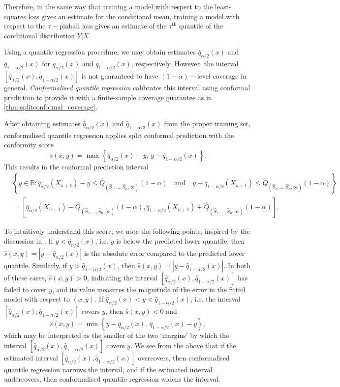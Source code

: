 \documentclass[11pt, titlepage]{article} %
\newcommand{\R}{\mathrm}
\numberwithin{equation}{section}
\theoremstyle{definition}
\numberwithin{theorem}{section}
\numberwithin{lemma}{section}
\numberwithin{corollary}{section}
\numberwithin{proposition}{section}
\numberwithin{definition}{section}
\numberwithin{remark}{section}
\begin{document}
\noindent
Therefore, in the same way that training a model with respect to the least-squares loss gives an estimate for the conditional mean, training a model with respect to the \(\tau-\)pinball loss gives an estimate of the \(\tau^{\R{th}}\) quantile of the conditional distribution \(Y|X\). \vskip5pt

\noindent
Using a quantile regression procedure, we may obtain estimates \(\hat{q}_{\alpha/2}(x)\) and \(\hat{q}_{1-\alpha/2}(x)\) for \(q_{\alpha/2}(x)\) and \(q_{1-\alpha/2}(x)\), respectively. However, the interval \([\hat{q}_{\alpha/2}(x), \hat{q}_{1-\alpha/2}(x)]\) is not guaranteed to have \((1-\alpha)-\)level coverage in general. \textit{Conformalised quantile regression} \cite{romano2019_CQR} calibrates this interval using conformal prediction to provide it with a finite-sample coverage guarantee as in \cref{thm:splitconformal_coverage}. \vskip5pt

\noindent
After obtaining estimates \(\hat{q}_{\alpha/2}(x)\) and \(\hat{q}_{1-\alpha/2}(x)\) from the proper training set, conformalised quantile regression applies split conformal prediction with the conformity score \[
    \hat{s}(x,y) = \max\left\{ \hat{q}_{\alpha/2}(x) - y, \, y - \hat{q}_{1-\alpha/2}(x) \right\}.
\] This results in the conformal prediction interval \begin{align*}
    &\left\{ y \in \mathbb{R}: \hat{q}_{\alpha/2}(X_{n+1}) - y \leq \hat{Q}_{(\hat{S}_1, \ldots, \hat{S}_n, \infty)}(1-\alpha) \quad \R{and} \quad y - \hat{q}_{1-\alpha/2}(X_{n+1}) \leq \hat{Q}_{(\hat{S}_1, \ldots, \hat{S}_n, \infty)}(1-\alpha) \right\} \\
    &= \left[\hat{q}_{\alpha/2}(X_{n+1}) - \hat{Q}_{(\hat{S}_1, \ldots, \hat{S}_n, \infty)}(1-\alpha), \hat{q}_{1-\alpha/2}(X_{n+1}) + \hat{Q}_{(\hat{S}_1, \ldots, \hat{S}_n, \infty)}(1-\alpha)  \right].
\end{align*}

\noindent
To intuitively understand this score, we note the following points, inspired by the discussion in \cite{romano2019_CQR}. If \(y < \hat{q}_{\alpha/2}(x)\), i.e. \(y\) is below the predicted lower quantile, then \(\hat{s}(x,y) = |y - \hat{q}_{\alpha/2}(x)|\) is the absolute error compared to the predicted lower quantile. Similarly, if \(y > \hat{q}_{1-\alpha/2}(x)\), then \(\hat{s}(x,y) = |y - \hat{q}_{1-\alpha/2}(x)|.\) In both of these cases, \(\hat{s}(x,y) > 0\), indicating the interval \([\hat{q}_{\alpha/2}(x), \hat{q}_{1-\alpha/2}(x)]\) has failed to cover \(y\), and its value measures the magnitude of the error in the fitted model with respect to \((x,y)\). If \(\hat{q}_{\alpha/2}(x) < y < \hat{q}_{1-\alpha/2}(x)\), i.e. the interval \([\hat{q}_{\alpha/2}(x), \hat{q}_{1-\alpha/2}(x)]\) covers \(y\), then \(\hat{s}(x,y) < 0\) and \[\hat{s}(x,y) = \min \left\{ y - \hat{q}_{\alpha/2}(x), \, \hat{q}_{1-\alpha/2}(x) - y \right\},\] which may be interpreted as the smaller of the two `margins' by which the interval \([\hat{q}_{\alpha/2}(x), \hat{q}_{1-\alpha/2}(x)]\) covers \(y\). We see from the above that if the estimated interval \([\hat{q}_{\alpha/2}(x), \hat{q}_{1-\alpha/2}(x)]\) overcovers, then conformalised quantile regression narrows the interval, and if the estimated interval undercovers, then conformalised quantile regression widens the interval.
\end{document}
